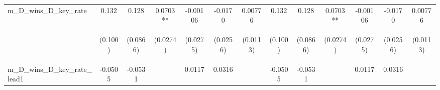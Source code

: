 \documentclass[]{article}
\begin{document}
\begin{center}
\begin{tabular}{lcccccccccccc}
m\_D\_wins\_D\_key\_rate & 0.132 & 0.128 & 0.0703** & -0.00106 & -0.0170 & 0.00776 & 0.132 & 0.128 & 0.0703** & -0.00106 & -0.0170 & 0.00776 \\
\vspace{4pt} & \begin{footnotesize}(0.100)\end{footnotesize} & \begin{footnotesize}(0.0866)\end{footnotesize} & \begin{footnotesize}(0.0274)\end{footnotesize} & \begin{footnotesize}(0.0275)\end{footnotesize} & \begin{footnotesize}(0.0256)\end{footnotesize} & \begin{footnotesize}(0.0113)\end{footnotesize} & \begin{footnotesize}(0.100)\end{footnotesize} & \begin{footnotesize}(0.0866)\end{footnotesize} & \begin{footnotesize}(0.0274)\end{footnotesize} & \begin{footnotesize}(0.0275)\end{footnotesize} & \begin{footnotesize}(0.0256)\end{footnotesize} & \begin{footnotesize}(0.0113)\end{footnotesize} \\
m\_D\_wins\_D\_key\_rate\_lead1 & -0.0505 & -0.0531 &  & 0.0117 & 0.0316 &  & -0.0505 & -0.0531 &  & 0.0117 & 0.0316 &  \\

\end{tabular}
\end{center}
\end{document}

